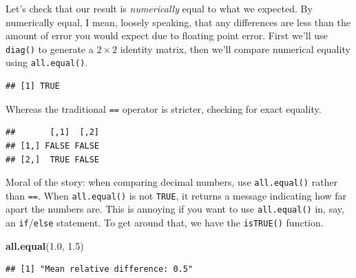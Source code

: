 \documentclass[12pt,oneside,openany]{book}
\newenvironment{Shaded}{\begin{snugshade}}{\end{snugshade}}
\newcommand{\KeywordTok}[1]{\textcolor[rgb]{0.13,0.29,0.53}{\textbf{#1}}}
\newcommand{\DecValTok}[1]{\textcolor[rgb]{0.00,0.00,0.81}{#1}}
\newcommand{\FloatTok}[1]{\textcolor[rgb]{0.00,0.00,0.81}{#1}}
\newcommand{\StringTok}[1]{\textcolor[rgb]{0.31,0.60,0.02}{#1}}
\newcommand{\OperatorTok}[1]{\textcolor[rgb]{0.81,0.36,0.00}{\textbf{#1}}}
\newcommand{\NormalTok}[1]{#1}
\begin{document}
Let's check that our result is \emph{numerically} equal to what we
expected. By numerically equal, I mean, loosely speaking, that any
differences are less than the amount of error you would expect due to
floating point error. First we'll use \texttt{diag()} to generate a
\(2 \times 2\) identity matrix, then we'll compare numerical equality
using \texttt{all.equal()}.

\begin{Shaded}
\end{Shaded}

\begin{verbatim}
## [1] TRUE
\end{verbatim}

Whereas the traditional \texttt{==} operator is stricter, checking for
exact equality.

\begin{Shaded}
\end{Shaded}

\begin{verbatim}
##       [,1]  [,2]
## [1,] FALSE FALSE
## [2,]  TRUE FALSE
\end{verbatim}

Moral of the story: when comparing decimal numbers, use
\texttt{all.equal()} rather than \texttt{==}. When \texttt{all.equal()}
is not \texttt{TRUE}, it returns a message indicating how far apart the
numbers are. This is annoying if you want to use \texttt{all.equal()}
in, say, an \texttt{if}/\texttt{else} statement. To get around that, we
have the \texttt{isTRUE()} function.

\begin{Shaded}
\begin{Highlighting}[]
\KeywordTok{all.equal}\NormalTok{(}\FloatTok{1.0}\NormalTok{, }\FloatTok{1.5}\NormalTok{)}
\end{Highlighting}
\end{Shaded}

\begin{verbatim}
## [1] "Mean relative difference: 0.5"
\end{verbatim}
\end{document}
